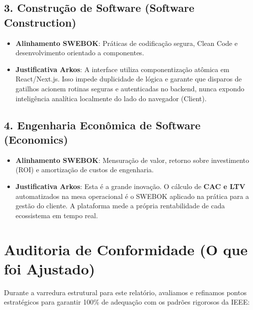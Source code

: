 \subsection{3. Construção de Software (Software Construction)}
\begin{itemize}
    \item \textbf{Alinhamento SWEBOK}: Práticas de codificação segura, Clean Code e desenvolvimento orientado a componentes.
    \item \textbf{Justificativa Arkos}: A interface utiliza componentização atômica em React/Next.js. Isso impede duplicidade de lógica e garante que disparos de gatilhos acionem rotinas seguras e autenticadas no backend, nunca expondo inteligência analítica localmente do lado do navegador (Client).
\end{itemize}

\subsection{4. Engenharia Econômica de Software (Economics)}
\begin{itemize}
    \item \textbf{Alinhamento SWEBOK}: Mensuração de valor, retorno sobre investimento (ROI) e amortização de custos de engenharia.
    \item \textbf{Justificativa Arkos}: Esta é a grande inovação. O cálculo de \textbf{CAC e LTV} automatizados na mesa operacional é o SWEBOK aplicado na prática para a gestão do cliente. A plataforma mede a própria rentabilidade de cada ecossistema em tempo real.
\end{itemize}

\section{Auditoria de Conformidade (O que foi Ajustado)}
Durante a varredura estrutural para este relatório, avaliamos e refinamos pontos estratégicos para garantir 100\% de adequação com os padrões rigorosos da IEEE:

